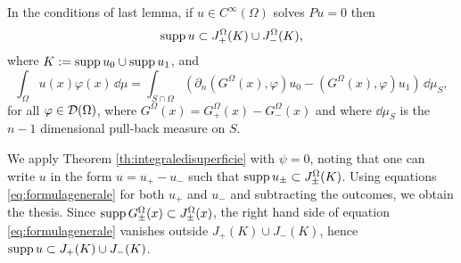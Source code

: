 \begin{cor}
	In the conditions of last lemma, if $u\in C^\infty(\Omega)$ solves $Pu=0$ then
	\[\text{supp}\,u\subset J_+^\Omega(K)\cup J_-^\Omega(K),\]
	where $K:=\text{supp}\,u_0\cup\text{supp}\,u_1$, and
	\begin{equation}
	\int_\Omega u(x)\varphi(x)\,\dd\mu=\int_{S\cap\Omega}\left(\partial_n(G^\Omega(x),\varphi)u_0-(G^\Omega(x),\varphi)u_1\right)\,\dd \mu_S,
	\label{eq:integraledisuperficie}
	\end{equation}
	for all $\varphi\in\mathcal{D}(\Omega)$, where $G^\Omega(x)=G_+^\Omega(x)-G_-^\Omega(x)$ and where $\dd \mu_S$ is the $n-1$ dimensional pull-back measure on $S$.
	\label{cor:integraledisuperficie}
\end{cor}
\Proof We apply Theorem \ref{th:integraledisuperficie} with $\psi=0$, noting that one can write $u$ in the form $u=u_+-u_-$ such that  $\text{supp}\,u_\pm\subset J_\pm^\Omega(K)$. Using equations \eqref{eq:formulagenerale} for both $u_+$ and $u_-$ and subtracting the outcomes, we obtain the thesis. Since $\text{supp}\,G_\pm^\Omega(x)\subset J_\pm^\Omega(x)$, the right hand side of equation \eqref{eq:formulagenerale} vanishes outside $J_+(K)\cup J_-(K)$, hence $\text{supp}\,u\subset J_+(K)\cup J_-(K)$.\endproof\\

